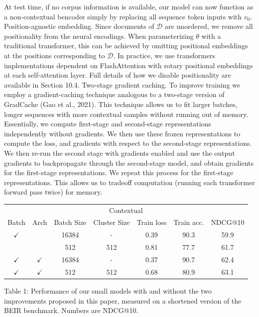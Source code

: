 At test time, if no corpus information is available, our model can now function as a non-contextual bencoder simply by replacing all sequence token inputs with \(v_{0}\).
Position-agnostic embedding. Since documents of \(\mathcal{D}\) are unordered, we remove all positionality from the neural encodings. When parameterizing \(\theta\) with a traditional transformer, this can be achieved by omitting positional embeddings at the positions corresponding to \(\mathcal{D}\). In practice, we use transformers implementations dependent on FlashAttention with rotary positional embeddings at each self-attention layer. Full details of how we disable positionality are available in Section 10.4.
Two-stage gradient caching. To improve training we employ a gradient-caching technique analogous to a two-stage version of GradCache (Gao et al., 2021). This technique allows us to fit larger batches, longer sequences with more contextual samples without running out of memory. Essentially, we compute first-stage and second-stage representations independently without gradients. We then use these frozen representations to compute the loss, and gradients with respect to the second-stage representations. We then re-run the second stage with gradients enabled and use the output gradients to backpropagate through the second-stage model, and obtain gradients for the first-stage representations. We repeat this process for the first-stage representations. This allows us to tradeoff computation (running each transformer forward pass twice) for memory.

\begin{tabular}{ccccccc}
\hline \multicolumn{7}{c}{ Contextual } \\
Batch & Arch & Batch Size & Cluster Size & Train loss & Train acc. & NDCG@10 \\
\hline\(\checkmark\) & & 16384 & - & 0.39 & 90.3 & 59.9 \\
& & 512 & 512 & 0.81 & 77.7 & 61.7 \\
\(\checkmark\) & \(\checkmark\) & 16384 & - & 0.37 & 90.7 & 62.4 \\
\(\checkmark\) & \(\checkmark\) & 512 & 512 & 0.68 & 80.9 & 63.1 \\
\hline
\end{tabular}
Table 1: Performance of our small models with and without the two improvements proposed in this paper, measured on a shortened version of the BEIR benchmark. Numbers are NDCG@10.
